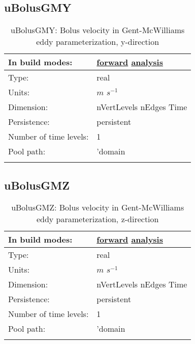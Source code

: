 \subsection[uBolusGMY]{uBolusGMY}
\label{subsec:var_sec_diagnostics_uBolusGMY}
\begin{center}
\begin{longtable}{| p{2.0in} | p{4.0in} |}
        \hline 
        In build modes: & \hyperref[subsec:forward_var_tab_diagnostics]{forward} \hyperref[subsec:analysis_var_tab_diagnostics]{analysis} \\
        \hline 
        Type: & real \\
        \hline 
        Units: & $m$ $s^{-1}$ \\
        \hline 
        Dimension: & nVertLevels nEdges Time \\
        \hline 
        Persistence: & persistent \\
        \hline 
        Number of time levels: & 1 \\
        \hline 
            Pool path: & 'domain %
 \\
		 \hline 
    \caption{uBolusGMY: Bolus velocity in Gent-McWilliams eddy parameterization, y-direction}
\end{longtable}
\end{center}
\subsection[uBolusGMZ]{uBolusGMZ}
\label{subsec:var_sec_diagnostics_uBolusGMZ}
\begin{center}
\begin{longtable}{| p{2.0in} | p{4.0in} |}
        \hline 
        In build modes: & \hyperref[subsec:forward_var_tab_diagnostics]{forward} \hyperref[subsec:analysis_var_tab_diagnostics]{analysis} \\
        \hline 
        Type: & real \\
        \hline 
        Units: & $m$ $s^{-1}$ \\
        \hline 
        Dimension: & nVertLevels nEdges Time \\
        \hline 
        Persistence: & persistent \\
        \hline 
        Number of time levels: & 1 \\
        \hline 
            Pool path: & 'domain %
 \\
		 \hline 
    \caption{uBolusGMZ: Bolus velocity in Gent-McWilliams eddy parameterization, z-direction}
\end{longtable}
\end{center}
